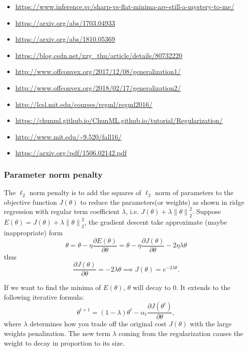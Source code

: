 \documentclass[titlestyle=hang,11pt]{elegantbook}
\begin{document}
\begin{itemize}
  \item \url{https://www.inference.vc/sharp-vs-flat-minima-are-still-a-mystery-to-me/}
  \item \url{https://arxiv.org/abs/1703.04933}
  \item \url{https://arxiv.org/abs/1810.05369}
  \item \url{https://blog.csdn.net/xzy_thu/article/details/80732220}
  \item \url{http://www.offconvex.org/2017/12/08/generalization1/}
  \item \url{http://www.offconvex.org/2018/02/17/generalization2/}
  \item \url{http://lcsl.mit.edu/courses/regml/regml2016/}
  \item \url{https://chunml.github.io/ChunML.github.io/tutorial/Regularization/}
  \item \url{http://www.mit.edu/~9.520/fall16/}
  \item \url{https://arxiv.org/pdf/1506.02142.pdf}
\end{itemize}

\subsubsection{Parameter norm penalty}

The $\ell_2$ norm penalty  is to add the squares of $\ell_2$ norm of parameters to the objective function $J(\theta)$ to reduce the parameters(or weights) 
as shown in ridge regression with regular term coefficient $\lambda$, i.e.
$ J(\theta)+\lambda {\|\theta\|}_{2}^{2}.$
Suppose  $E(\theta)=J(\theta)+\lambda {\|\theta\|}_{2}^{2}$, the gradient descent take approximate (maybe inappropriate)  form
$$ \theta=\theta-\eta\frac{\partial E(\theta)}{\partial \theta}=\theta -\eta\frac{\partial J(\theta)}{\partial \theta}-2\eta\lambda \theta$$
thus
$$ \frac{\partial J(\theta)}{\partial \theta}=-2\lambda\theta\implies J(\theta)=e^{-2\lambda \theta}. $$

If we want to find the minima of $E(\theta)$, $\theta$ will decay to $0$.
It extends to the following iterative formula:
$$\theta^{t+1} = (1-\lambda)\theta^{t}-\alpha_{t}\frac{\partial J(\theta^{t})}{\partial \theta},$$
where $\lambda$  determines how you trade off the original cost $J(\theta)$ with the large weights penalization.
The new term $\lambda$ coming from the regularization causes the weight to decay in proportion to its size.
\end{document}
